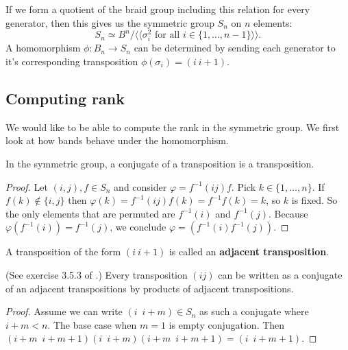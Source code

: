 \documentclass[12pt]{thesis}
\begin{document}
If we form a quotient of the braid group including this relation for every generator, then this gives us the symmetric
group $S_{n}$ on $n$ elements:
\begin{equation}
S_{n} \simeq B^{n} / \langle \langle \sigma_{i}^{2} \text{ for all } i \in \{ 1, \ldots, n-1 \}  \rangle \rangle.
\end{equation}
A homomorphism $\phi \colon B_{n} \rightarrow S_{n}$ can be determined by 
sending each generator to it's corresponding transposition $\phi(\sigma_{i}) = (i\ i+1)$.

\subsection{Computing rank}

We would like to be able to compute the rank in the symmetric
group. We first look at how bands behave under the homomorphism.

\begin{lemma}
    In the symmetric group, a conjugate of a transposition is a transposition.
\end{lemma}

\begin{proof}
    Let $(i,j), f \in S_{n}$ and consider $\varphi = f^{-1}(i j)f$.
    Pick $k \in \{ 1, \ldots, n \}$. 
    If $f(k) \not \in \{ i, j \}$
    then $\varphi(k) = f^{-1}(i j)f(k) = f^{-1}f(k) = k$,
    so $k$ is fixed.
    So the only elements that are permuted
    are $f^{-1}(i)$ and $f^{-1}(j)$.
    Because $\varphi(f^{-1}(i)) = f^{-1}(j)$,
    we conclude $\varphi = (f^{-1}(i) f^{-1}(j))$.
\end{proof}

\begin{definition}
    A transposition of the form $(i\ i+1)$ is called an \textbf{adjacent transposition}.
\end{definition}

\begin{lemma}
    (See exercise 3.5.3 of \cite{dummit-and-foote}.)
    Every transposition $(i j)$ can be written
    as a conjugate of an adjacent transpositions
    by products of adjacent transpositions. 
\end{lemma}

\begin{proof}
    Assume we can write $(i\enspace  i + m) \in S_{n}$ as such a conjugate where $i + m < n$.
    The base case when $m = 1$ is empty conjugation.
    Then $(i + m\enspace i + m + 1) (i\enspace i + m) (i + m\enspace i + m + 1) = (i\enspace i + m + 1)$.
\end{proof}
\end{document}
